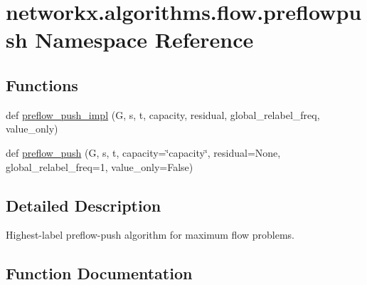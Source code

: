 \hypertarget{namespacenetworkx_1_1algorithms_1_1flow_1_1preflowpush}{}\section{networkx.\+algorithms.\+flow.\+preflowpush Namespace Reference}
\label{namespacenetworkx_1_1algorithms_1_1flow_1_1preflowpush}
\subsection*{Functions}
\begin{DoxyCompactItemize}
\item 
def \hyperlink{namespacenetworkx_1_1algorithms_1_1flow_1_1preflowpush_ac59f40377f257cd406e27ebcab0faef3}{preflow\+\_\+push\+\_\+impl} (G, s, t, capacity, residual, global\+\_\+relabel\+\_\+freq, value\+\_\+only)
\item 
def \hyperlink{namespacenetworkx_1_1algorithms_1_1flow_1_1preflowpush_a92bbe49dc52f80461406c300c7d3e477}{preflow\+\_\+push} (G, s, t, capacity=\char`\"{}capacity\char`\"{}, residual=None, global\+\_\+relabel\+\_\+freq=1, value\+\_\+only=False)
\end{DoxyCompactItemize}


\subsection{Detailed Description}
\begin{DoxyVerb}Highest-label preflow-push algorithm for maximum flow problems.
\end{DoxyVerb}
 

\subsection{Function Documentation}
\mbox{\label{namespacenetworkx_1_1algorithms_1_1flow_1_1preflowpush_a92bbe49dc52f80461406c300c7d3e477}} 
